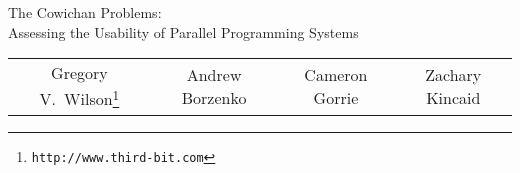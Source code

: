 \begin{Large}\begin{center}
The Cowichan Problems: \\
Assessing the Usability of Parallel Programming Systems
\end{center}\end{Large}

\vspace{\baselineskip}

\begin{center}
\begin{tabular}{cccc}
Gregory V.~Wilson\footnote{\verb`http://www.third-bit.com`}
&
Andrew Borzenko
&
Cameron Gorrie
&
Zachary Kincaid
\end{tabular}
\end{center}
